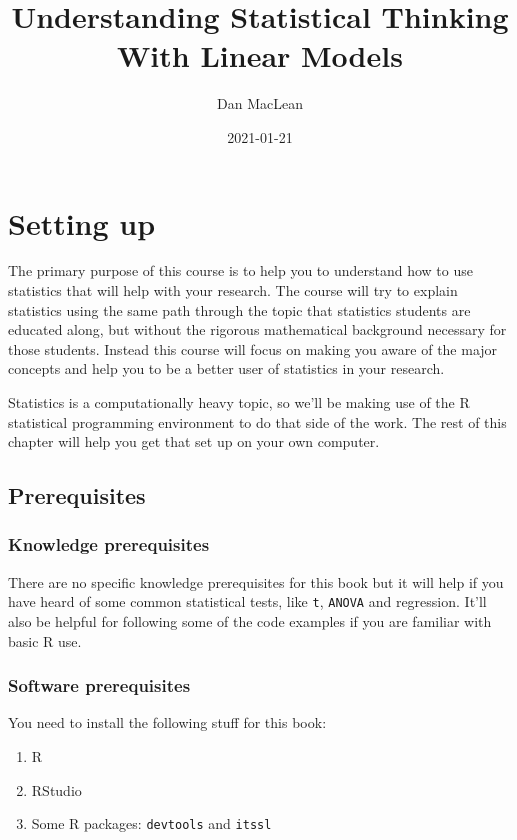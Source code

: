 \documentclass[
]{book}
\title{Understanding Statistical Thinking With Linear Models}
\author{Dan MacLean}
\date{2021-01-21}
\providecommand{\tightlist}{%
  \setlength{\itemsep}{0pt}\setlength{\parskip}{0pt}}
\begin{document}
\maketitle

{
\setcounter{tocdepth}{1}
\tableofcontents
}
\hypertarget{setting-up}{%
\chapter{Setting up}\label{setting-up}}

The primary purpose of this course is to help you to understand how to use statistics that will help with your research. The course will try to explain statistics using the same path through the topic that statistics students are educated along, but without the rigorous mathematical background necessary for those students. Instead this course will focus on making you aware of the major concepts and help you to be a better user of statistics in your research.

Statistics is a computationally heavy topic, so we'll be making use of the R statistical programming environment to do that side of the work. The rest of this chapter will help you get that set up on your own computer.

\hypertarget{prerequisites}{%
\section{Prerequisites}\label{prerequisites}}

\hypertarget{knowledge-prerequisites}{%
\subsection{Knowledge prerequisites}\label{knowledge-prerequisites}}

There are no specific knowledge prerequisites for this book but it will help if you have heard of some common statistical tests, like \texttt{t}, \texttt{ANOVA} and regression. It'll also be helpful for following some of the code examples if you are familiar with basic R use.

\hypertarget{software-prerequisites}{%
\subsection{Software prerequisites}\label{software-prerequisites}}

You need to install the following stuff for this book:

\begin{enumerate}
\def\labelenumi{\arabic{enumi}.}
\tightlist
\item
  R
\item
  RStudio
\item
  Some R packages: \texttt{devtools} and \texttt{itssl}
\end{enumerate}
\end{document}
